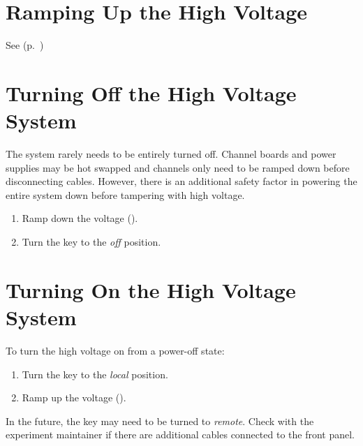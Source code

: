 \section{Ramping Up the High Voltage}
\label{sec:op_high_voltage:rampup}

See  (p.~\pageref{sec:op_high_voltage:rampdown})


\section{Turning Off the High Voltage System}
\label{sec:op_high_voltage:turnoff}

The system rarely needs to be entirely turned off.  Channel boards and power supplies may be hot swapped and channels only need to be ramped down before disconnecting cables.  However, there is an additional safety factor in powering the entire system down before tampering with high voltage.

\begin{enumerate}
\item Ramp down the voltage ().
\item Turn the key to the \textit{off} position.
\end{enumerate}

\section{Turning On the High Voltage System}
\label{sec:op_high_voltage:turnon}

To turn the high voltage on from a power-off state:
\begin{enumerate}
\item Turn the key to the \textit{local} position.
\item Ramp up the voltage ().
\end{enumerate}

\begin{note}
  In the future, the key may need to be turned to \emph{remote}.  Check with the experiment maintainer if there are additional cables connected to the front panel.
\end{note}


